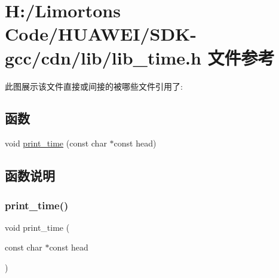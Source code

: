 \hypertarget{_s_d_k-gcc_2cdn_2lib_2lib__time_8h}{}\section{H\+:/\+Limorton\textquotesingle{}s Code/\+H\+U\+A\+W\+E\+I/\+S\+D\+K-\/gcc/cdn/lib/lib\+\_\+time.h 文件参考}
\label{_s_d_k-gcc_2cdn_2lib_2lib__time_8h}
此图展示该文件直接或间接的被哪些文件引用了\+:
\subsection*{函数}
\begin{DoxyCompactItemize}
\item 
void \hyperlink{_s_d_k-gcc_2cdn_2lib_2lib__time_8h_ab29ebb2880f415753dacc54c0aa9468f}{print\+\_\+time} (const char $\ast$const head)
\end{DoxyCompactItemize}


\subsection{函数说明}
\mbox{\label{_s_d_k-gcc_2cdn_2lib_2lib__time_8h_ab29ebb2880f415753dacc54c0aa9468f}} 
\subsubsection{\texorpdfstring{print\+\_\+time()}{print\_time()}}
{\footnotesize\ttfamily void print\+\_\+time (\begin{DoxyParamCaption}\item[{const char $\ast$const}]{head }\end{DoxyParamCaption})}

